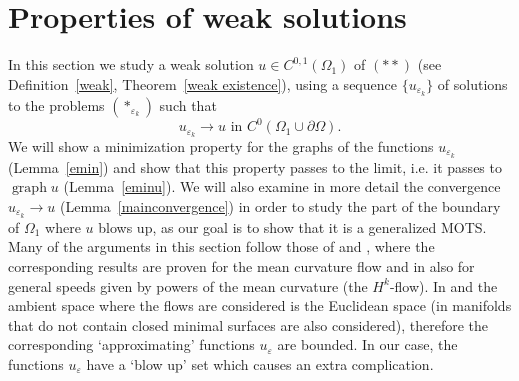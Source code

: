 \documentclass[11pt]{amsart}
\renewcommand{\epsilon}{\varepsilon}
\DeclareMathOperator{\graph}{graph} \DeclareMathOperator{\closure}{Closure}
\def\e{\epsilon}
\begin{document}
\section{Properties of weak solutions}\label{properties}

In this section we study a weak solution $u\in C^{0,1}(\Omega_1)$  of $(**)$ (see Definition~\ref{weak}, Theorem~\ref{weak existence}), using a sequence   $\{u_{\e_k}\}$  of solutions to the problems $(*_{\varepsilon_k})$ such that
\[ u_{\varepsilon_k}\to u \text{  in $C^0({\Omega_1}\cup\partial\Omega)$}.\]
We will show a minimization property for the graphs of the  functions $u_{\e_k}$ (Lemma~\ref{emin}) and show that this property passes to the limit, i.e. it passes to $\graph u$ (Lemma~\ref{eminu}). We will also examine in more detail the convergence $u_{\e_k}\to u$ (Lemma~\ref{mainconvergence}) in order to study the part of the  boundary of $\Omega_1$ where $u$ blows up, as our goal is to show that it is a generalized MOTS. Many of the arguments in this section follow those of \cite{MS} and \cite{S08}, where the corresponding results are proven for the mean curvature flow and in \cite{S08} also for general  speeds given by powers of the mean curvature (the $H^k$-flow). In \cite{MS} and \cite{S08} the ambient space where the flows are considered is the Euclidean space (in \cite{S08} manifolds that do not contain closed minimal surfaces are also considered), therefore the corresponding `approximating' functions $u_\e$ are bounded. In our case, the functions $u_\e$ have a `blow up' set which causes an extra complication. 
\end{document}
